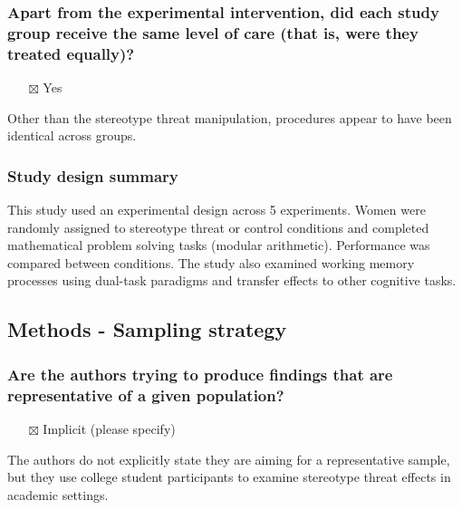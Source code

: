 \documentclass[
  doc, a4paper]{apa7}
\providecommand{\tightlist}{%
  \setlength{\itemsep}{0pt}\setlength{\parskip}{0pt}}
\begin{document}
\subsubsection{Apart from the experimental intervention, did each study group receive the same level of care (that is, were they treated equally)?}\label{apart-from-the-experimental-intervention-did-each-study-group-receive-the-same-level-of-care-that-is-were-they-treated-equally}

\begin{itemize}
\tightlist
\item[$\boxtimes$]
  Yes
\end{itemize}

Other than the stereotype threat manipulation, procedures appear to have been identical across groups.

\subsubsection{Study design summary}\label{study-design-summary}

This study used an experimental design across 5 experiments. Women were randomly assigned to stereotype threat or control conditions and completed mathematical problem solving tasks (modular arithmetic). Performance was compared between conditions. The study also examined working memory processes using dual-task paradigms and transfer effects to other cognitive tasks.

\subsection{Methods - Sampling strategy}\label{methods---sampling-strategy}

\subsubsection{Are the authors trying to produce findings that are representative of a given population?}\label{are-the-authors-trying-to-produce-findings-that-are-representative-of-a-given-population}

\begin{itemize}
\tightlist
\item[$\boxtimes$]
  Implicit (please specify)
\end{itemize}

The authors do not explicitly state they are aiming for a representative sample, but they use college student participants to examine stereotype threat effects in academic settings.
\end{document}
